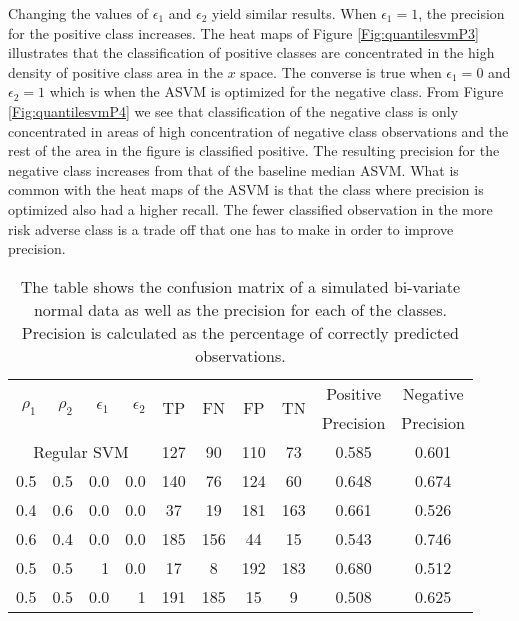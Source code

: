 \documentclass[twoside,11pt]{article}
\begin{document}
Changing the values of $\epsilon_1$ and $\epsilon_2$ yield similar results. When $\epsilon_1=1$, the precision for the positive class increases. The heat maps of Figure \ref{Fig:quantilesvmP3} illustrates that the classification of positive classes are concentrated in the high density of positive class area in the $x$ space. The converse is true when $\epsilon_1=0$ and $\epsilon_2=1$ which is when the ASVM is optimized for the negative class. From Figure \ref{Fig:quantilesvmP4} we see that classification of the negative class is only concentrated in areas of high concentration of negative class observations and the rest of the area in the figure is classified positive. The resulting precision for the negative class increases from that of the baseline median ASVM. What is common with the heat maps of the ASVM is that the class where precision is optimized also had a higher recall. The fewer classified observation in the more risk adverse class is a trade off that one has to make in order to improve precision.

\begin{table}[htp]\label{simulatedsvmtable}

\begin{tabular}{rrrr|cccccc}

\hline
 \multirow{2}{*}{$\rho_1$} & \multirow{2}{*}{$\rho_2$} & \multirow{2}{*}{$\epsilon_1$} & \multirow{2}{*}{$\epsilon_2$} & \multirow{2}{*}{TP}    & \multirow{2}{*}{FN}    & \multirow{2}{*}{FP}    & \multirow{2}{*}{TN} & Positive & Negative \\
    &&&&&&&&  Precision &  Precision \\

\hline
\hline
\multicolumn{4}{c|}{Regular SVM} &        127 &         90 &        110 &         73 &      0.585 &      0.601 \\

0.5   & 0.5   & 0.0   & 0.0 &        140 &         76 &        124 &         60 &      0.648 &      0.674 \\

0.4   & 0.6   & 0.0   & 0.0 &         37 &         19 &        181 &        163 &      0.661 &      0.526 \\

0.6   & 0.4   & 0.0   & 0.0 &        185 &        156 &         44 &         15 &      0.543 &      0.746 \\

0.5   & 0.5   & 1   & 0.0 &         17 &          8 &        192 &        183 &      0.680 &      0.512 \\

0.5   & 0.5   & 0.0   & 1 &        191 &        185 &         15 &          9 &      0.508 &      0.625 \\
\hline
\hline
\end{tabular}
\caption{The table shows the confusion matrix of a simulated bi-variate normal data as well as the precision for each of the classes. Precision is calculated as the percentage of correctly predicted observations.}
\end{table}
\end{document}
